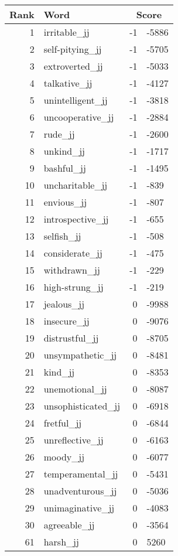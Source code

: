 \begin{longtable}[!htbp]{| rlr@{.}l |}
    \hline
    \textbf{Rank} & \textbf{Word} & \multicolumn{2}{c|}{\textbf{Score}} \\
    \hline
    \endhead
    1 & irritable\_jj & -1 & -5886 \\
    2 & self-pitying\_jj & -1 & -5705 \\
    3 & extroverted\_jj & -1 & -5033 \\
    4 & talkative\_jj & -1 & -4127 \\
    5 & unintelligent\_jj & -1 & -3818 \\
    6 & uncooperative\_jj & -1 & -2884 \\
    7 & rude\_jj & -1 & -2600 \\
    8 & unkind\_jj & -1 & -1717 \\
    9 & bashful\_jj & -1 & -1495 \\
    10 & uncharitable\_jj & -1 & -839 \\
    11 & envious\_jj & -1 & -807 \\
    12 & introspective\_jj & -1 & -655 \\
    13 & selfish\_jj & -1 & -508 \\
    14 & considerate\_jj & -1 & -475 \\
    15 & withdrawn\_jj & -1 & -229 \\
    16 & high-strung\_jj & -1 & -219 \\
    17 & jealous\_jj & 0 & -9988 \\
    18 & insecure\_jj & 0 & -9076 \\
    19 & distrustful\_jj & 0 & -8705 \\
    20 & unsympathetic\_jj & 0 & -8481 \\
    21 & kind\_jj & 0 & -8353 \\
    22 & unemotional\_jj & 0 & -8087 \\
    23 & unsophisticated\_jj & 0 & -6918 \\
    24 & fretful\_jj & 0 & -6844 \\
    25 & unreflective\_jj & 0 & -6163 \\
    26 & moody\_jj & 0 & -6077 \\
    27 & temperamental\_jj & 0 & -5431 \\
    28 & unadventurous\_jj & 0 & -5036 \\
    29 & unimaginative\_jj & 0 & -4083 \\
    30 & agreeable\_jj & 0 & -3564 \\
    61 & harsh\_jj & 0 & 5260 \\

\end{longtable}
